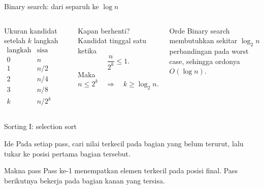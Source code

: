 \documentclass[aspectratio=169,11pt]{beamer}
\begin{document}
\begin{frame}{Binary search: dari separuh ke $\log n$}
\begin{columns}[T]
\begin{block}{Ukuran kandidat setelah $k$ langkah}
\[
\begin{array}{c|c}
\text{langkah} & \text{sisa kandidat}\\\hline
0 & n\\
1 & n/2\\
2 & n/4\\
3 & n/8\\
k & n/2^k
\end{array}
\]
\end{block}
\begin{block}{Kapan berhenti?}
Kandidat tinggal satu ketika
\[
\frac{n}{2^k}\le 1.
\]
Maka
\[
 n \le 2^k \quad \Rightarrow \quad k \ge \log_2 n.
\]
\end{block}
\pause
\begin{alertblock}{Orde}
Binary search membutuhkan sekitar $\log_2 n$ perbandingan pada worst case, sehingga ordonya $O(\log n)$.
\end{alertblock}
\end{columns}
\end{frame}

\begin{frame}{Sorting I: selection sort}
\begin{block}{Ide}
Pada setiap pass, cari nilai terkecil pada bagian yang belum terurut, lalu tukar ke posisi pertama bagian tersebut.
\end{block}
\begin{center}
\end{center}
\begin{alertblock}{Makna pass}
Pass ke-1 menempatkan elemen terkecil pada posisi final. Pass berikutnya bekerja pada bagian kanan yang tersisa.
\end{alertblock}
\end{frame}
\end{document}
